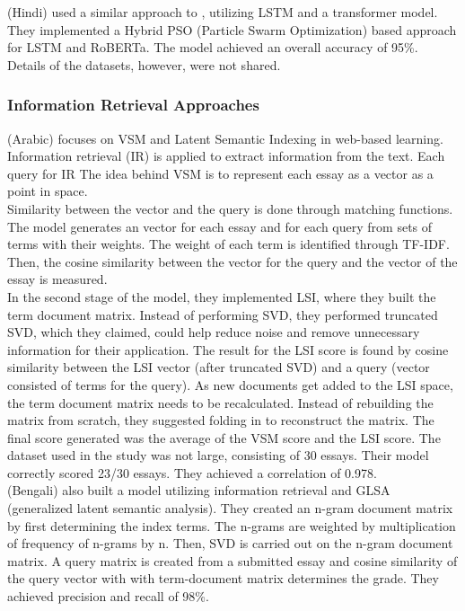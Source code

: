 \documentclass{article}
\begin{document}
	\textbf{\textcite{11_walia2024hybrid}} (Hindi) used a similar approach to \textcite{10_singh2023hindi}, utilizing LSTM and a transformer model. They implemented a Hybrid PSO (Particle Swarm Optimization) based approach for LSTM and RoBERTa. The model achieved an overall accuracy of 95\%. Details of the datasets, however, were not shared.
	
	\subsubsection*{Information Retrieval Approaches}
	\textbf{\textcite{17_abbas2015svm}} (Arabic) focuses on VSM and Latent Semantic Indexing in web-based learning. Information retrieval (IR) is applied to extract information from the text. Each query for IR  The idea behind VSM is to represent each essay as a vector as a point in space. \\ Similarity between the vector and the query is done through matching functions. The model generates an vector for each essay and for each query from sets of terms with their weights. The weight of each term is identified through TF-IDF. Then, the cosine similarity between the vector for the query and the vector of the essay is measured. \\ In the second stage of the model, they implemented LSI, where they built the term document matrix. Instead of performing SVD, they performed truncated SVD, which they claimed, could help reduce noise and remove unnecessary information for their application. The result for the LSI score is found by cosine similarity between the LSI vector (after truncated SVD) and a query (vector consisted of terms for the query). As new documents get added to the LSI space, the term document matrix needs to be recalculated. Instead of rebuilding the matrix from scratch, they suggested folding in to reconstruct the matrix. The final score generated was the average of the VSM score and the LSI score. The dataset used in the study was not large, consisting of 30 essays. Their model correctly scored 23/30 essays. They achieved a correlation of 0.978. \\
	
	
	\textbf{\textcite{24_islam2013abess}} (Bengali) also built a model utilizing information retrieval and GLSA (generalized latent semantic analysis). They created an n-gram document matrix by first determining the index terms. The n-grams are weighted by multiplication of frequency of n-grams by n. Then, SVD is carried out on the n-gram document matrix. A query matrix is created from a submitted essay and cosine similarity of the query vector with with term-document matrix determines the grade. They achieved precision and recall of 98\%. 
	
\end{document}

